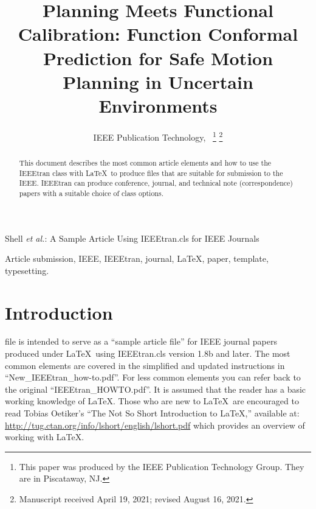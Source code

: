 \documentclass[lettersize,journal]{IEEEtran}
\begin{document}
\title{Planning Meets Functional Calibration: Function Conformal Prediction for Safe Motion Planning in Uncertain Environments}

\author{IEEE Publication Technology,~
\thanks{This paper was produced by the IEEE Publication Technology Group. They are in Piscataway, NJ.}%
\thanks{Manuscript received April 19, 2021; revised August 16, 2021.}}

%
{Shell \MakeLowercase{\textit{et al.}}: A Sample Article Using IEEEtran.cls for IEEE Journals}


\maketitle

\begin{abstract}
This document describes the most common article elements and how to use the IEEEtran class with \LaTeX \ to produce files that are suitable for submission to the IEEE.  IEEEtran can produce conference, journal, and technical note (correspondence) papers with a suitable choice of class options. 
\end{abstract}

\begin{IEEEkeywords}
Article submission, IEEE, IEEEtran, journal, \LaTeX, paper, template, typesetting.
\end{IEEEkeywords}

\section{Introduction}
 file is intended to serve as a ``sample article file''
for IEEE journal papers produced under \LaTeX\ using
IEEEtran.cls version 1.8b and later. The most common elements are covered in the simplified and updated instructions in ``New\_IEEEtran\_how-to.pdf''. For less common elements you can refer back to the original ``IEEEtran\_HOWTO.pdf''. It is assumed that the reader has a basic working knowledge of \LaTeX. Those who are new to \LaTeX \ are encouraged to read Tobias Oetiker's ``The Not So Short Introduction to \LaTeX ,'' available at: \url{http://tug.ctan.org/info/lshort/english/lshort.pdf} which provides an overview of working with \LaTeX.
\end{document}
